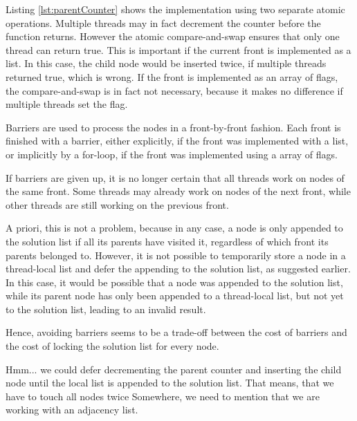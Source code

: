 Listing \ref{lst:parentCounter} shows the implementation using two separate atomic operations. Multiple threads may in fact decrement the counter before the function returns.
However the atomic compare-and-swap ensures that only one thread can return true. This is important if the current front is implemented as a list.
In this case, the child node would be inserted twice, if multiple threads returned true, which is wrong.
If the front is implemented as an array of flags, the compare-and-swap is in fact not necessary, because it makes no difference if multiple threads set the flag.

Barriers are used to process the nodes in a front-by-front fashion.
Each front is finished with a barrier, either explicitly, if the front was implemented with a list, or implicitly by a for-loop, if the front was implemented using a array of flags.

If barriers are given up, it is no longer certain that all threads work on nodes of the same front.
Some threads may already work on nodes of the next front, while other threads are still working on the previous front.

A priori, this is not a problem, because in any case, a node is only appended to the solution list if all its parents have visited it, regardless of which front its parents belonged to.
However, it is not possible to temporarily store a node in a thread-local list and defer the appending to the solution list, as suggested earlier.
In this case, it would be possible that a node was appended to the solution list, while its parent node has only been appended to a thread-local list, but not yet to the solution list, leading to an invalid result.

Hence, avoiding barriers seems to be a trade-off between the cost of barriers and the cost of locking the solution list for every node.

\begin{invisible}
Hmm... we could defer decrementing the parent counter and inserting the child node until the local list is appended to the solution list. That means, that we have to touch all nodes twice
Somewhere, we need to mention that we are working with an adjacency list.
\end{invisible}
